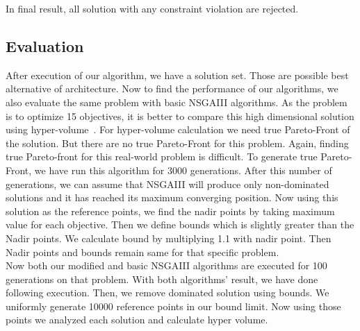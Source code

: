 \documentclass[letterpaper, 10 pt, conference]{ieeeconf}  %
\begin{document}
In final result, all solution with any constraint violation are rejected.


\subsection{Evaluation}
After execution of our algorithm, we have a solution set. Those are possible best alternative of architecture. Now to find the performance of our algorithms, we also evaluate the same problem with basic NSGAIII algorithms. As the problem is to optimize 15 objectives, it is better to compare this high dimensional solution using hyper-volume~\cite{bader2011hype}. For hyper-volume calculation we need true Pareto-Front of the solution. But there are no true Pareto-Front for this problem. Again, finding true Pareto-front for this real-world problem is difficult. To generate true Pareto-Front, we have run this algorithm for 3000 generations. After this number of generations, we can assume that NSGAIII will produce only non-dominated solutions and it has reached its maximum converging position.
Now using this solution as the reference points, we find the nadir points by taking maximum value for each objective. Then we define bounds which is slightly greater than the Nadir points. We calculate bound by multiplying 1.1 with nadir point. Then Nadir points and bounds remain same for that specific problem. \\

Now both our modified and basic NSGAIII algorithms are executed for 100 generations on that problem. With both algorithms' result, we have done following execution. 
Then, we remove dominated solution using bounds. We uniformly generate 10000 reference points in our bound limit. Now using those points we analyzed each solution and calculate hyper volume.
\end{document}
